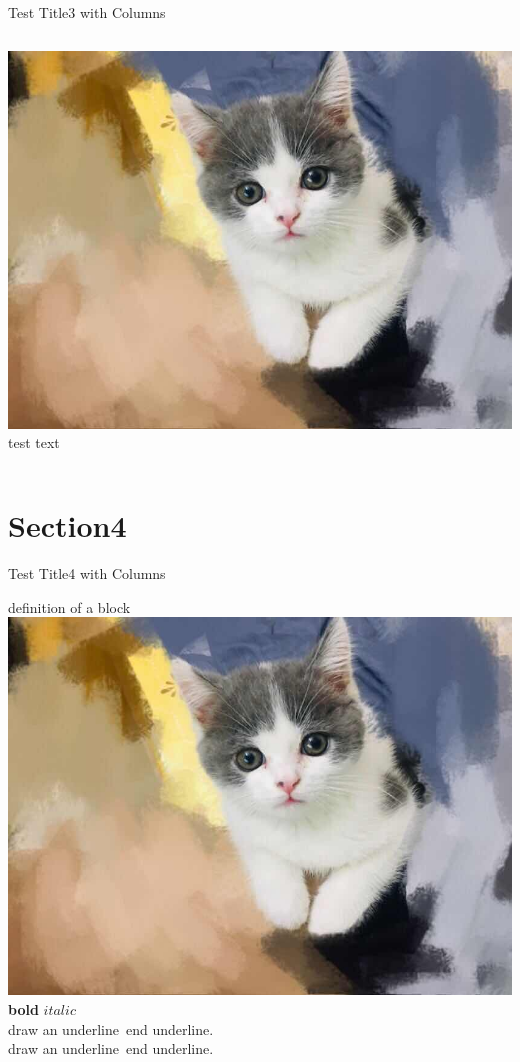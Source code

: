 \documentclass{beamer}
\begin{document}
\begin{frame}{Test Title3 with Columns}
    \begin{columns}
        \includegraphics[width=.85\textwidth]{Yugor.jpg}
        test text
    \end{columns}
\end{frame}

\section{Section4}

\begin{frame}{Test Title4 with Columns}
    \begin{block}{definition of a block}
        \vspace{0.5em}
        \includegraphics[width=.35\textwidth]{Yugor.jpg}
        \\[2pt]\textbf{bold} $italic$ \\[10pt] %
        draw an underline
        \,end underline.\\[10pt] %

        draw an underline
        \,end underline.\\[10pt] %
        \vspace{0.5em}
    \end{block}
\end{frame}
\end{document}

